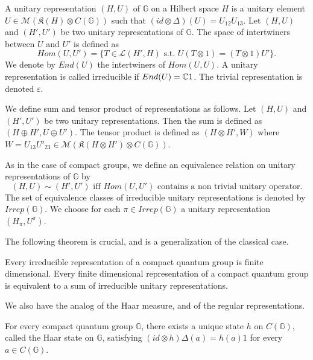 \begin{definition} A unitary representation $(H,U)$ of $\mathbb G$ on a Hilbert space $H$ is a unitary element $U \in \mathcal M(\mathfrak K(H)\otimes C(\mathbb G))$ such that $(id\otimes\Delta)(U) = U_{12}U_{13}$. Let $(H,U)$ and $(H',U')$ be two unitary representations of $\mathbb G$. The space of intertwiners between $U$ and $U'$ is defined as 
\[Hom(U,U') = \{T\in \mathcal L(H',H) \text{ s.t. }U(T\otimes 1) = (T\otimes 1) U' \}.\]
We denote by $End(U)$ the intertwiners of $Hom(U,U)$. A unitary representation is called irreducible if $End(U) = \mathbb C 1$. The trivial representation is denoted $\varepsilon$.
\end{definition}

We define sum and tensor product of representations as follows. Let $(H,U)$ and $(H',U')$ be two unitary representations. Then the sum is defined as $(H\oplus H', U\oplus U')$. The tensor product is defined as $(H\otimes H',W)$ where $W = U_{13} U'_{23}\in \mathcal M(\mathfrak K(H\otimes H')\otimes C(\mathbb G))$. 

\begin{definition}
As in the case of compact groups, we define an equivalence relation on unitary representations of $\mathbb G$ by 
\[(H,U)\sim (H',U') \text{ iff } Hom(U,U') \text{ contains a non trivial unitary operator}.\]
The set of equivalence classes of irreducible unitary representations is denoted by $Irrep(\mathbb G)$. We choose for each $\pi\in Irrep (\mathbb G)$ a unitary representation $(H_\pi, U^{\pi})$. 
\end{definition}

The following theorem is crucial, and is a generalization of the classical case. 

\begin{thm} Every irreducible representation of a compact quantum group is finite dimensional. Every finite dimensional representation of a compact quantum group is equivalent to a sum of irreducible unitary representations. 
\end{thm}
 
We also have the analog of the Haar measure, and of the regular representations.

\begin{prop}
For every compact quantum group $\mathbb G$, there exists a unique state $h$ on $C(\mathbb G)$, called the Haar state on $\mathbb G$, satisfying $(id\otimes h)\Delta(a) = h(a)1$ for every $a\in C(\mathbb G)$. 
\end{prop}


